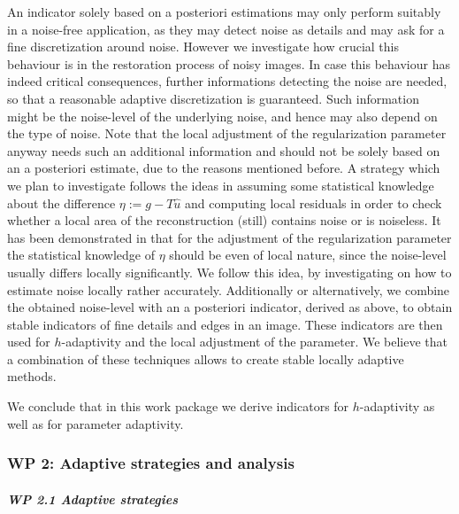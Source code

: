 \documentclass[enabledeprecatedfontcommands,cleardoublepage=empty,headsepline,twoside,11pt,DIV=15,BCOR=12mm,final]{scrartcl}
\begin{document}
An indicator solely based on a posteriori estimations may only perform suitably in a noise-free application, as they may detect noise as details and may ask for a fine discretization around noise. However we investigate how crucial this behaviour is in the restoration process of noisy images. In case this behaviour has indeed critical consequences, further informations detecting the noise are needed, so that a reasonable adaptive discretization is guaranteed. Such information might be the noise-level of the underlying noise, and hence may also depend on the type of noise. Note that the local adjustment of the regularization parameter anyway needs such an additional information and should not be solely based on an a posteriori estimate, due to the reasons mentioned before. A strategy which we plan to investigate follows the ideas in  assuming some statistical knowledge about the difference $\eta:= g- T \hat{u}$ and computing local residuals in order to check whether a local area of the reconstruction (still) contains noise or is noiseless. It has been demonstrated in  that for the adjustment of the regularization parameter the statistical knowledge of $\eta$ should be even of local nature, since the noise-level usually differs locally significantly. We follow this idea, by investigating on how to estimate noise locally rather accurately. Additionally or alternatively, we combine the obtained noise-level with an a posteriori indicator, derived as above, to obtain stable indicators of fine details and edges in an image. These indicators are then used for $h$-adaptivity and the local adjustment of the parameter. We believe that a combination of these techniques allows to create stable locally adaptive methods.
 
We conclude that in this work package we derive indicators for $h$-adaptivity as well as for parameter adaptivity.
  
\subsubsection*{WP 2: Adaptive strategies and analysis}
  
\subparagraph{WP 2.1 Adaptive strategies} 
\end{document}
